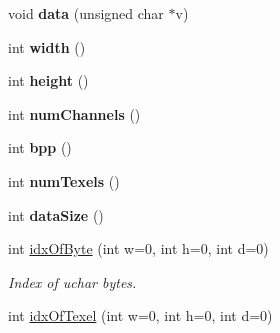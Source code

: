 \begin{DoxyCompactItemize}
\item 
\hypertarget{classvsr_1_1_texture_a5767570644a1768158d4771b194f4002}{void {\bfseries data} (unsigned char $\ast$v)}\label{classvsr_1_1_texture_a5767570644a1768158d4771b194f4002}

\item 
\hypertarget{classvsr_1_1_texture_aec9e2782defb941157354ddf347a4409}{int {\bfseries width} ()}\label{classvsr_1_1_texture_aec9e2782defb941157354ddf347a4409}

\item 
\hypertarget{classvsr_1_1_texture_aef101ec0ffd1f77d8daaed5f9ce1132e}{int {\bfseries height} ()}\label{classvsr_1_1_texture_aef101ec0ffd1f77d8daaed5f9ce1132e}

\item 
\hypertarget{classvsr_1_1_texture_a159b0bde49eeaba9a803bf2566141d96}{int {\bfseries num\-Channels} ()}\label{classvsr_1_1_texture_a159b0bde49eeaba9a803bf2566141d96}

\item 
\hypertarget{classvsr_1_1_texture_a39d8a9578562306ff6eacf5b807597f1}{int {\bfseries bpp} ()}\label{classvsr_1_1_texture_a39d8a9578562306ff6eacf5b807597f1}

\item 
\hypertarget{classvsr_1_1_texture_a02784c8eb2d9d9c074ca18e1504420ec}{int {\bfseries num\-Texels} ()}\label{classvsr_1_1_texture_a02784c8eb2d9d9c074ca18e1504420ec}

\item 
\hypertarget{classvsr_1_1_texture_a52f959cab26215102f62e35a126ce145}{int {\bfseries data\-Size} ()}\label{classvsr_1_1_texture_a52f959cab26215102f62e35a126ce145}

\item 
\hypertarget{classvsr_1_1_texture_a93cda6cf5d532dbebab07444e5640ac9}{int \hyperlink{classvsr_1_1_texture_a93cda6cf5d532dbebab07444e5640ac9}{idx\-Of\-Byte} (int w=0, int h=0, int d=0)}\label{classvsr_1_1_texture_a93cda6cf5d532dbebab07444e5640ac9}

\begin{DoxyCompactList}\small\item\em Index of uchar bytes. \end{DoxyCompactList}\item 
\hypertarget{classvsr_1_1_texture_a6f32da863f7724af01395089c7966f8a}{int \hyperlink{classvsr_1_1_texture_a6f32da863f7724af01395089c7966f8a}{idx\-Of\-Texel} (int w=0, int h=0, int d=0)}\label{classvsr_1_1_texture_a6f32da863f7724af01395089c7966f8a}


\end{DoxyCompactItemize}
